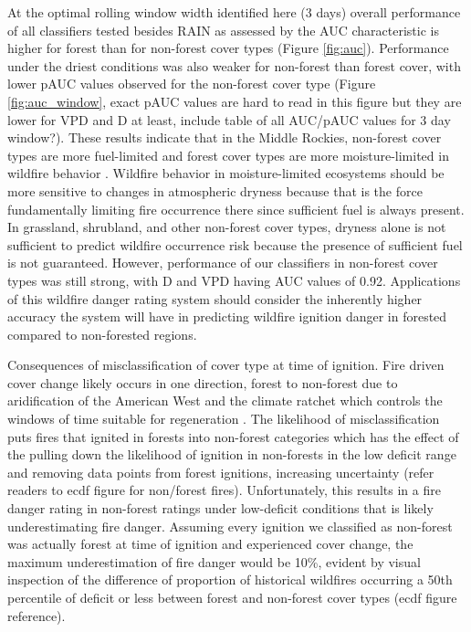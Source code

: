 \documentclass[11p]{article}
\begin{document}
\begin{table}
{At the optimal rolling window width identified here (3 days) overall performance of all classifiers tested besides RAIN as assessed by the AUC characteristic is higher for forest than for non-forest cover types (Figure \ref{fig:auc}). Performance under the driest conditions was also weaker for non-forest than forest cover, with lower pAUC values observed for the non-forest cover type (Figure \ref{fig:auc_window}, exact pAUC values are hard to read in this figure but they are lower for VPD and D at least, include table of all AUC/pAUC values for 3 day window?). These results indicate that in the Middle Rockies, non-forest cover types are more fuel-limited and forest cover types are more moisture-limited in wildfire behavior \citep{meynEnvironmentalDriversLarge2007}. Wildfire behavior in moisture-limited ecosystems should be more sensitive to changes in atmospheric dryness because that is the force fundamentally limiting fire occurrence there since sufficient fuel is always present. In grassland, shrubland, and other non-forest cover types, dryness alone is not sufficient to predict wildfire occurrence risk because the presence of sufficient fuel is not guaranteed. However, performance of our classifiers in non-forest cover types was still strong, with D and VPD having AUC values of 0.92. Applications of this wildfire danger rating system should consider the inherently higher accuracy the system will have in predicting wildfire ignition danger in forested compared to non-forested regions.  

Consequences of misclassification of cover type at time of ignition. Fire driven cover change likely occurs in one direction, forest to non-forest due to aridification of the American West and the climate ratchet which controls the windows of time suitable for regeneration \citep{jacksonEcologyRatchetEvents2009}. The likelihood of misclassification puts fires that ignited in forests into non-forest categories which has the effect of the pulling down the likelihood of ignition in non-forests in the low deficit range and removing data points from forest ignitions, increasing uncertainty (refer readers to ecdf figure for non/forest fires). Unfortunately, this results in a fire danger rating in non-forest ratings under low-deficit conditions that is likely underestimating fire danger. Assuming every ignition we classified as non-forest was actually forest at time of ignition and experienced cover change, the maximum underestimation of fire danger would be 10\%, evident by visual inspection of the difference of proportion of historical wildfires occurring a 50th percentile of deficit or less between forest and non-forest cover types (ecdf figure reference). 

}
\end{table}
\end{document}

